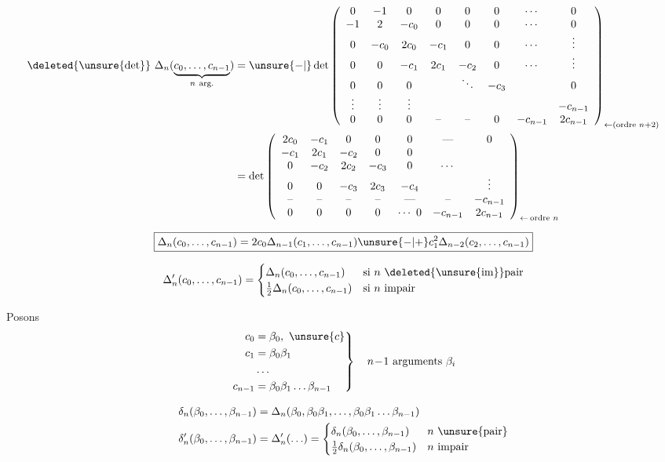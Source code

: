 \[
\begin{aligned}
\deleted{\unsure{\det}}\ \Delta_n(\underbrace{c_0,\ldots,c_{n-1}}_{n\ \text{arg.}})
&=\unsure{-|{}}\det\left(\begin{array}{cccccccc}
0&-1&0&0&0&0&\cdots&0\\
-1&2&-c_0&0&0&0&\cdots&0\\
0&-c_0&2c_0&-c_1&0&0&\cdots&\vdots\\
0&0&-c_1&2c_1&-c_2&0&\cdots&\vdots\\
0&0&0&&\ddots&-c_3&&0\\
\vdots&\vdots&\vdots&&&&&-c_{n-1}\\
0&0&0&\text{--}&\text{--}&0&-c_{n-1}&2c_{n-1}
\end{array}\right)_{\leftarrow(\text{ordre }n+2)}\\
&=\det\left(\begin{array}{ccccccc}
2c_0&-c_1&0&0&0&\text{---}&0\\
-c_1&2c_1&-c_2&0&0&&\\
0&-c_2&2c_2&-c_3&0&\cdots&\\
0&0&-c_3&2c_3&-c_4&&\vdots\\
\text{--}&\text{--}&\text{--}&\text{--}&\text{---}&\text{--}&-c_{n-1}\\
0&0&0&0&\cdots\ 0&-c_{n-1}&2c_{n-1}
\end{array}\right)_{\leftarrow\,\text{ordre }n}
\end{aligned}
\]

\[
\boxed{\Delta_n(c_0,\ldots,c_{n-1})=2c_0\Delta_{n-1}(c_1,\ldots,c_{n-1})\unsure{-|+}c_1^2\Delta_{n-2}(c_2,\ldots,c_{n-1})}
\]

\[
\Delta'_n(c_0,\ldots,c_{n-1})=
\begin{cases}
\Delta_n(c_0,\ldots,c_{n-1})&\text{si $n$ \deleted{\unsure{im}}pair}\\
\frac12\Delta_n(c_0,\ldots,c_{n-1})&\text{si $n$ impair}
\end{cases}
\]

Posons
\[
\left.\begin{aligned}
c_0&=\beta_0,\ \unsure{c}\\
c_1&=\beta_0\beta_1\\
&\ldots\\
c_{n-1}&=\beta_0\beta_1\ldots\beta_{n-1}
\end{aligned}\right\}\quad n\!-\!1\ \text{arguments }\beta_i
\]

\[
\begin{aligned}
\delta_n(\beta_0,\ldots,\beta_{n-1})&=\Delta_n(\beta_0,\beta_0\beta_1,\ldots,\beta_0\beta_1\ldots\beta_{n-1})\\
\delta'_n(\beta_0,\ldots,\beta_{n-1})&=\Delta'_n(\ldots)=\begin{cases}
\delta_n(\beta_0,\ldots,\beta_{n-1})&n\ \text{\unsure{pair}}\\
\frac12\delta_n(\beta_0,\ldots,\beta_{n-1})&n\ \text{impair}
\end{cases}
\end{aligned}
\]

